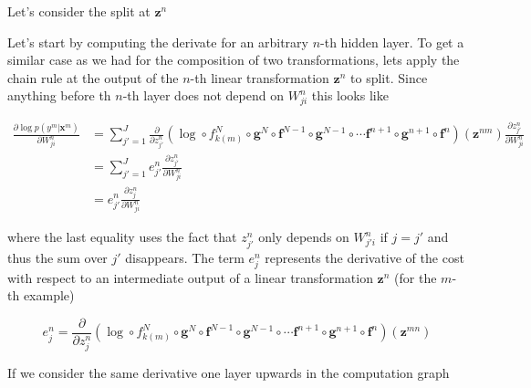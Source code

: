 \noindent Let's consider the split at $\mathbf{z}^n$

%

Let's start by computing the derivate for an arbitrary $n$-th hidden layer. To
get a similar case as we had for the composition of two transformations, lets
apply the chain rule at the output of the $n$-th linear transformation
$\mathbf{z}^n$ to split. Since anything before th $n$-th layer does not depend
on $W_{ji}^n$ this looks like  

\begin{align}
\frac{\partial \log p(y^m | \mathbf{x}^m)}{\partial W_{ji}^n} & = \sum_{j'=1}^J \frac{\partial}{\partial z^n_{j'}} (\log \circ f_{k(m)}^N \circ \mathbf{g}^N \circ \mathbf{f}^{N-1} \circ \mathbf{g}^{N-1} \circ \cdots \mathbf{f}^{n+1} \circ \mathbf{g}^{n+1} \circ \mathbf{f}^{n})(\mathbf{z}^{nm})\frac{\partial z^n_{j'}}{\partial W_{ji}^n}\nonumber\\ & = \sum_{j'=1}^J e^{n}_{j'} \frac{\partial z^n_{j'}}{\partial W_{ji}^n}\nonumber\\ & = e^{n}_{j'}\frac{\partial z^n_{j}}{\partial W_{ji}^n}
\label{eq:partialfn}
\end{align}

where the last equality uses the fact that $z^n_{j'}$ only depends on
$W_{j'i}^n$ if $j=j'$ and thus the sum over $j'$ disappears. The term $e^{n}_j$
represents the derivative of the cost with respect to an intermediate output of
a linear transformation $\mathbf{z}^n$ (for the $m$-th example)

\begin{equation}
e^{n}_j = \frac{\partial}{\partial z^{n}_{j}} (\log \circ f_{k(m)}^N \circ \mathbf{g}^N \circ \mathbf{f}^{N-1} \circ \mathbf{g}^{N-1} \circ \cdots \mathbf{f}^{n+1} \circ \mathbf{g}^{n+1} \circ \mathbf{f}^{n})(\mathbf{z}^{mn}) 
\end{equation}

\noindent If we consider the same derivative one layer upwards in the
computation graph  

